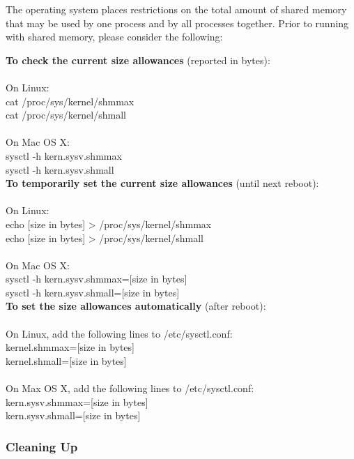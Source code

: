 \documentclass[letterpaper, 12pt]{article}
\begin{document}
The operating system places restrictions on the total amount of shared
memory that may be used by one process and by all processes together.
Prior to running {\transit} with shared memory, please consider the
following: \newline

\noindent
{\bf To check the current size allowances} (reported in bytes): \\
\\
On Linux: \\
{\tttm cat /proc/sys/kernel/shmmax} \\
{\tttm cat /proc/sys/kernel/shmall} \\
\\
On Mac OS X: \\
{\tttm sysctl -h kern.sysv.shmmax} \\
{\tttm sysctl -h kern.sysv.shmall} \\

\bigskip
\noindent
{\bf To temporarily set the current size allowances} (until next reboot): \\
\\
On Linux: \\
{\tttm [sudo] echo [size in bytes] > /proc/sys/kernel/shmmax} \\
{\tttm [sudo] echo [size in bytes] > /proc/sys/kernel/shmall} \\
\\
On Mac OS X: \\
{\tttm [sudo] sysctl -h kern.sysv.shmmax=[size in bytes]} \\
{\tttm [sudo] sysctl -h kern.sysv.shmall=[size in bytes]} \\

\bigskip
\noindent
{\bf To set the size allowances automatically} (after reboot): \\
\\
On Linux, add the following lines to {\tttm /etc/sysctl.conf}: \\
{\tttm kernel.shmmax=[size in bytes]} \\
{\tttm kernel.shmall=[size in bytes]} \\
\\
On Max OS X, add the following lines to {\tttm /etc/sysctl.conf}: \\
{\tttm kern.sysv.shmmax=[size in bytes]} \\
{\tttm kern.sysv.shmall=[size in bytes]} \\

\subsubsection{Cleaning Up}
\end{document}
